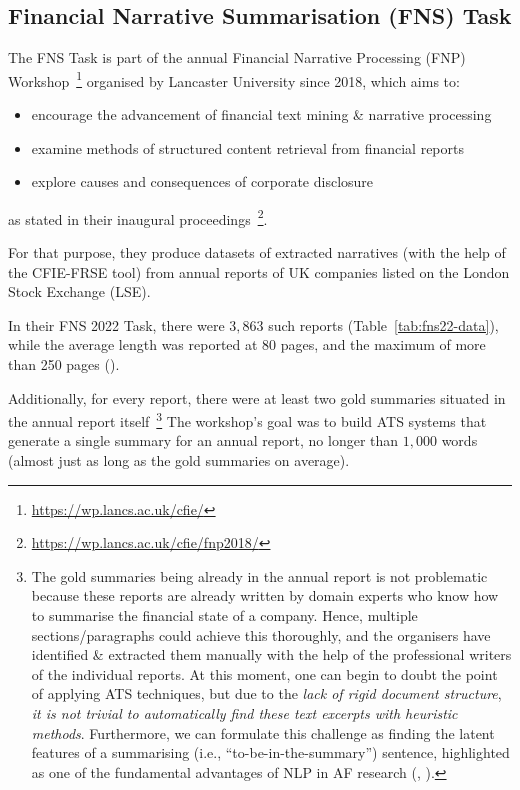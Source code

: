 \subsection{Financial Narrative Summarisation (FNS) Task} \label{subsec:fns}
The FNS Task is part of the annual Financial Narrative Processing (FNP) Workshop~\footnote{\url{https://wp.lancs.ac.uk/cfie/}} organised by Lancaster University since 2018, which aims to:
\begin{itemize}
    \item encourage the advancement of financial text mining \& narrative processing
    \item examine methods of structured content retrieval from financial reports
    \item explore causes and consequences of corporate disclosure
\end{itemize} as stated in their inaugural proceedings~\footnote{\url{https://wp.lancs.ac.uk/cfie/fnp2018/}}.

For that purpose, they produce datasets of extracted narratives (with the help of the CFIE-FRSE tool) from annual reports of UK companies listed on the London Stock Exchange (LSE).

In their FNS 2022 Task, there were $3,863$ such reports (Table~\ref{tab:fns22-data}), while the average length was reported at 80 pages, and the maximum of more than 250 pages (\cite{litvak-vanetik-2021-summarization}).

Additionally, for every report, there were at least two gold summaries situated in the annual report itself~\footnote{
    The gold summaries being already in the annual report is not problematic because these reports are already written by domain experts who know how to summarise the financial state of a company.
    Hence, multiple sections/paragraphs could achieve this thoroughly, and the organisers have identified \& extracted them manually with the help of the professional writers of the individual reports.
    At this moment, one can begin to doubt the point of applying ATS techniques, but due to the \emph{lack of rigid document structure}, \emph{it is not trivial to automatically find these text excerpts with heuristic methods}.
    Furthermore, we can formulate this challenge as finding the latent features of a summarising (i.e., \enquote{to-be-in-the-summary}) sentence, highlighted as one of the fundamental advantages of NLP in AF research (\cite{lewis_young_2019}, \cite{el-haj2019meaning}).
}
The workshop's goal was to build ATS systems that generate a single summary for an annual report, no longer than $1,000$ words (almost just as long as the gold summaries on average).

